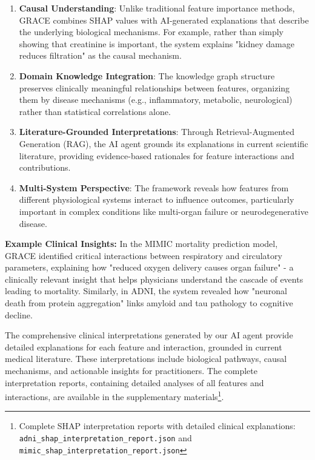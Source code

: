 \documentclass{article}
\begin{document}
\begin{enumerate}
    \item \textbf{Causal Understanding}: Unlike traditional feature importance methods, GRACE combines SHAP values with AI-generated explanations that describe the underlying biological mechanisms. For example, rather than simply showing that creatinine is important, the system explains "kidney damage reduces filtration" as the causal mechanism.
    
    \item \textbf{Domain Knowledge Integration}: The knowledge graph structure preserves clinically meaningful relationships between features, organizing them by disease mechanisms (e.g., inflammatory, metabolic, neurological) rather than statistical correlations alone.
    
    \item \textbf{Literature-Grounded Interpretations}: Through Retrieval-Augmented Generation (RAG), the AI agent grounds its explanations in current scientific literature, providing evidence-based rationales for feature interactions and contributions.
    
    \item \textbf{Multi-System Perspective}: The framework reveals how features from different physiological systems interact to influence outcomes, particularly important in complex conditions like multi-organ failure or neurodegenerative disease.
\end{enumerate}

\textbf{Example Clinical Insights:} In the MIMIC mortality prediction model, GRACE identified critical interactions between respiratory and circulatory parameters, explaining how "reduced oxygen delivery causes organ failure" - a clinically relevant insight that helps physicians understand the cascade of events leading to mortality. Similarly, in ADNI, the system revealed how "neuronal death from protein aggregation" links amyloid and tau pathology to cognitive decline.

The comprehensive clinical interpretations generated by our AI agent provide detailed explanations for each feature and interaction, grounded in current medical literature. These interpretations include biological pathways, causal mechanisms, and actionable insights for practitioners. The complete interpretation reports, containing detailed analyses of all features and interactions, are available in the supplementary materials\footnote{Complete SHAP interpretation reports with detailed clinical explanations: \texttt{adni\_shap\_interpretation\_report.json} and \texttt{mimic\_shap\_interpretation\_report.json}}.
\end{document}
